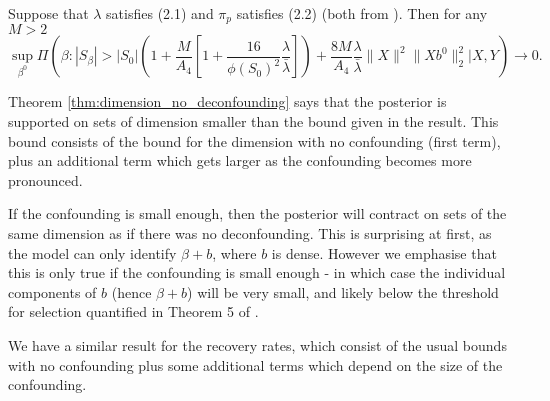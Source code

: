 \documentclass[11pt]{article}
\numberwithin{equation}{section}
\begin{document}
\begin{theorem}\label{thm:dimension_no_deconfounding}
	Suppose that {\color{assumption} $\lambda$ satisfies  (2.1) and $\pi_p$ satisfies (2.2)} (both from \cite{CS-HV2015}). Then for any $M > 2$
$$
	\sup_{\beta^0} \Pi\left(\beta: |S_\beta| > |S_0|\left(1 + \frac{M}{A_4}\left[1 + \frac{16}{\phi(S_0)^2}\frac{\lambda}{\bar{\lambda}} \right]\right)  + \frac{8M}{A_4}\frac{\lambda}{\bar{\lambda}} \|X\|^2\|Xb^0\|_2^2  \big| X, Y \right) \rightarrow 0.
$$
\end{theorem}
Theorem \ref{thm:dimension_no_deconfounding} says that the posterior is supported on sets of dimension smaller than the bound given in the result. This bound consists of the bound for the dimension with no confounding (first term), plus an additional term which gets larger as the confounding becomes more pronounced. 

If the confounding is small enough, then the posterior will contract on sets of the same dimension as if there was no deconfounding. This is surprising at first, as the model can only identify $\beta + b$, where $b$ is dense. However we emphasise that this is only true if the confounding is small enough - in which case the individual components of $b$ (hence $\beta + b$) will be very small, and likely below the threshold for selection quantified in Theorem 5 of \cite{CS-HV2015}. 

We have a similar result for the recovery rates, which consist of the usual bounds with no confounding plus some additional terms which depend on the size of the confounding.
\end{document}
